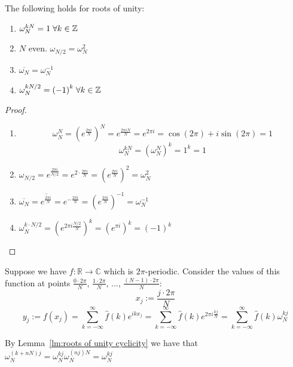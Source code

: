 \begin{lemma} The following holds for roots of unity:
	\begin{enumerate}[label=\thelemma.\arabic*]
		\item $\omega_N^{kN} = 1 \; \forall{k\in \mathbb{Z}}$ \label{lm:roots of unity cyclicity}
		\item $N$ even. $\omega_{N/2} = \omega_N^2$ \label{lm:roots of unity fft}
		\item $\overline{\omega_{N}} = \omega_N^{-1}$ \label{lm:roots of unity conjugate}
		\item $\omega_{N}^{kN/2} = {(-1)}^k \; \forall{k\in \mathbb{Z}}$\label{lm:roots of unity half spin}
	\end{enumerate}
\end{lemma}
\begin{proof} \hfill
	\begin{enumerate}
		\item
		      \[\omega_N^N
			      = {\left(e^{\frac{2\pi i}{N}}\right)}^N
			      = e^{\frac{2\pi iN}{N}}
			      = e^{2\pi i}
			      = \cos(2\pi) + i \sin(2\pi) = 1\]
		      \[\omega_N^{kN}
			      = {\left(\omega_N^{N}\right)}^k = 1^k = 1\]

		\item $\omega_{N/2}
			      = e^{\frac{2\pi i}{N/2}}
			      = e^{2\cdot \frac{2\pi i}{N}}
			      = {\left(e^{\frac{2\pi i}{N}}\right)}^2
			      = \omega_N^2$
		\item $\overline{\omega_{N}}
			      = \overline{e^{\frac{2\pi i}{N}}}
			      = e^{-\frac{2\pi i}{N}}
				      = {\left(e^{\frac{2\pi i}{N}}\right)}^{-1}
			      = \omega_N^{-1}$
		\item $\omega_N^{k\cdot N/2}
			      = {(e^{2\pi i \frac{N/2}{N}})}^k
			      = {(e^{\pi i})}^k = {(-1)}^k$
	\end{enumerate}
\end{proof}

Suppose we have $f: \mathbb{R} \rightarrow \mathbb{C}$ which is $2\pi$-periodic.
Consider the values of this function at points $\frac{0\cdot 2\pi}{N}$,  $\frac{1\cdot 2\pi}{N}$, ..., $\frac{(N-1)\cdot 2\pi}{N}$:
\[x_j:= \frac{j\cdot 2\pi}{N}\]
\[y_j := f(x_j)
	= \sum_{k=-\infty}^\infty \hat{f}(k)e^{ikx_j}
	= \sum_{k=-\infty}^\infty \hat{f}(k)e^{2\pi i\frac{kj}{N}}
	= \sum_{k=-\infty}^\infty \hat{f}(k)\omega_N^{kj}\]

By Lemma~\ref{lm:roots of unity cyclicity} we have that
$\omega_N^{(k+nN)j}
	= \omega_N^{kj}\omega_N^{(nj)N}
	= \omega_N^{kj}$

